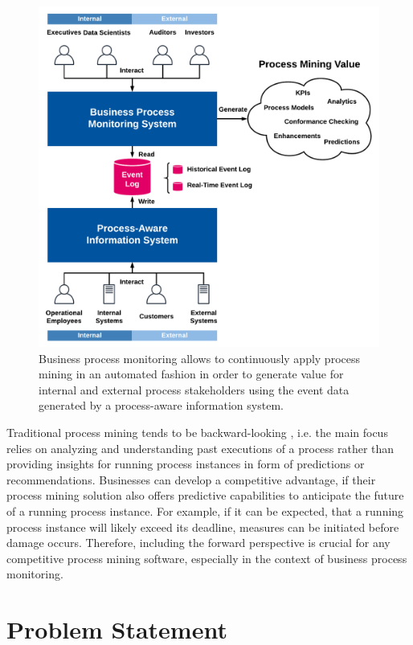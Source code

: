 \begin{figure}[htbp!]
	\centering
	\includegraphics[width=\textwidth]{figures/process-monitoring}
	\caption[Process mining in the context of business process monitoring]{Business process monitoring allows to continuously apply process mining in an automated fashion in order to generate value for internal and external process stakeholders using the event data generated by a process-aware information system.}
	\label{fig:process-monitoring}
\end{figure}

Traditional process mining tends to be backward-looking \cite{DBLP:conf/scsc/Aalst18}, i.e. the main focus relies on analyzing and understanding past executions of a process rather than providing insights for running process instances in form of predictions or recommendations.
Businesses can develop a competitive advantage, if their process mining solution also offers predictive capabilities to anticipate the future of a running process instance.
For example, if it can be expected, that a running process instance will likely exceed its deadline, measures can be initiated before damage occurs.
Therefore, including the forward perspective is crucial for any competitive process mining software, especially in the context of business process monitoring.

\section{Problem Statement}

